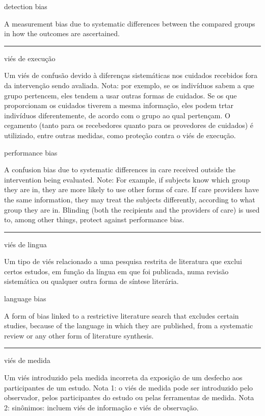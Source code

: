 \documentclass[
  openany]{book}
\begin{document}
detection bias

A measurement bias due to systematic differences between the compared groups in how the outcomes are ascertained.

\begin{center}\rule{0.5\linewidth}{0.5pt}\end{center}

viés de execução

Um viés de confusão devido à diferenças sistemáticas nos cuidados recebidos fora da intervenção sendo avaliada. Nota: por exemplo, se os indivíduos sabem a que grupo pertencem, eles tendem a usar outras formas de cuidados. Se os que proporcionam os cuidados tiverem a mesma informação, eles podem trtar indivíduos diferentemente, de acordo com o grupo ao qual pertençam. O cegamento (tanto para os recebedores quanto para os provedores de cuidados) é utiliziado, entre outras medidas, como proteção contra o viés de execução.

performance bias

A confusion bias due to systematic differences in care received outside the intervention being evaluated. Note: For example, if subjects know which group they are in, they are more likely to use other forms of care. If care providers have the same information, they may treat the subjects differently, according to what group they are in. Blinding (both the recipients and the providers of care) is used to, among other things, protect against performance bias.

\begin{center}\rule{0.5\linewidth}{0.5pt}\end{center}

viés de lingua

Um tipo de viés relacionado a uma pesquisa restrita de literatura que exclui certos estudos, em função da língua em que foi publicada, numa revisão sistemática ou qualquer outra forma de síntese literária.

language bias

A form of bias linked to a restrictive literature search that excludes certain studies, because of the language in which they are published, from a systematic review or any other form of literature synthesis.

\begin{center}\rule{0.5\linewidth}{0.5pt}\end{center}

viés de medida

Um viés introduzido pela medida incorreta da exposição de um desfecho aos participantes de um estudo. Nota 1: o viés de medida pode ser introduzido pelo observador, pelos participantes do estudo ou pelas ferramentas de medida. Nota 2: sinônimos: incluem viés de informação e viés de observação.
\end{document}
